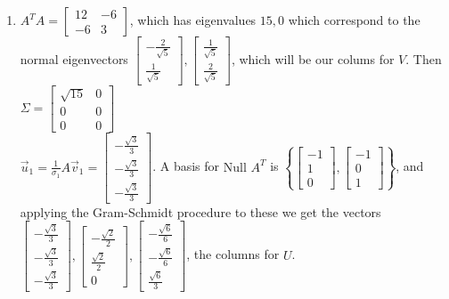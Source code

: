 \documentclass[10pt,english]{article}
\begin{document}
\begin{enumerate}
\begin{enumerate}
        \item $A^TA=\begin{bmatrix}12&-6\\-6&3\end{bmatrix}$, which has eigenvalues $15,0$ which correspond to the normal eigenvectors $\begin{bmatrix}-\frac{2}{\sqrt{5}}\\\frac{1}{\sqrt{5}}\end{bmatrix},\begin{bmatrix}\frac{1}{\sqrt{5}}\\\frac{2}{\sqrt{5}}\end{bmatrix}$, which will be our colums for $V$. Then $\Sigma=\begin{bmatrix}\sqrt{15}&0\\0&0\\0&0\end{bmatrix}$\\ 
        $\vec{u}_1=\frac{1}{\sigma_1}A\vec{v}_1=\begin{bmatrix}-\frac{\sqrt{3}}{3}\\-\frac{\sqrt{3}}{3}\\-\frac{\sqrt{3}}{3}\end{bmatrix}$. A basis for $\text{Null }A^T$ is $\left\{\begin{bmatrix}-1\\1\\0\end{bmatrix},\begin{bmatrix}-1\\0\\1\end{bmatrix}\right\}$, and applying the Gram-Schmidt procedure to these we get the vectors $\begin{bmatrix}-\frac{\sqrt{3}}{3}\\-\frac{\sqrt{3}}{3}\\-\frac{\sqrt{3}}{3}\end{bmatrix},\begin{bmatrix}-\frac{\sqrt{2}}{2}\\\frac{\sqrt{2}}{2}\\0\end{bmatrix},\begin{bmatrix}-\frac{\sqrt{6}}{6}\\-\frac{\sqrt{6}}{6}\\\frac{\sqrt{6}}{3}\end{bmatrix}$, the columns for $U$. \\ 

\end{enumerate}
\end{enumerate}
\end{document}
